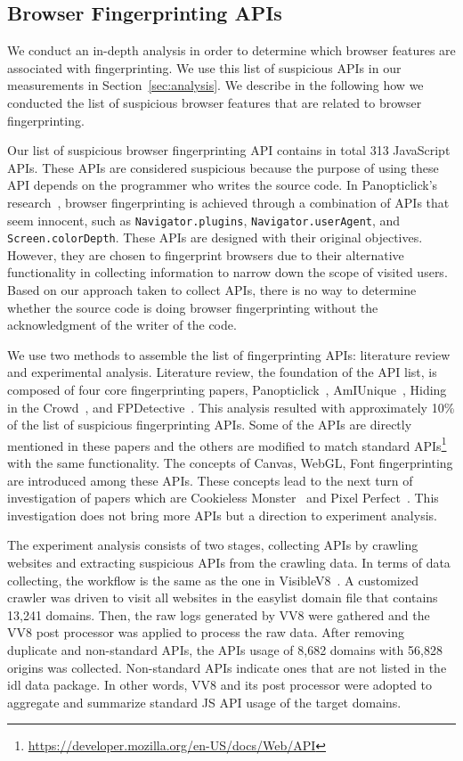 \subsection{Browser Fingerprinting APIs}
\label{sec:fp-apis}

We conduct an in-depth analysis in order to determine which browser features are associated with fingerprinting. We use this list of suspicious APIs in our measurements in Section~\ref{sec:analysis}. We describe in the following how we conducted the list of suspicious browser features that are related to browser fingerprinting.

Our list of suspicious browser fingerprinting API contains in total 313 JavaScript APIs. These APIs are considered suspicious because the purpose of using these API depends on the programmer who writes the source code. In Panopticlick's research~\cite{panopticlick}, browser fingerprinting is achieved through a combination of APIs that seem innocent, such as \texttt{Navigator.plugins}, \texttt{Navigator.userAgent}, and \texttt{Screen.colorDepth}. These APIs are designed with their original objectives. However, they are chosen to fingerprint browsers due to their alternative functionality in collecting information to narrow down the scope of visited users. Based on our approach taken to collect APIs, there is no way to determine whether the source code is doing browser fingerprinting without the acknowledgment of the writer of the code. 

We use two methods to assemble the list of fingerprinting APIs: literature review and experimental analysis. Literature review, the foundation of the API list, is composed of four core fingerprinting papers, Panopticlick~\cite{panopticlick}, AmIUnique~\cite{amiunique}, Hiding in the Crowd~\cite{hidinginthecrowd}, and FPDetective~\cite{fpdetective}. This analysis resulted with approximately 10\% of the list of suspicious fingerprinting APIs. Some of the APIs are directly mentioned in these papers and the others are modified to match standard APIs\footnote{\url{https://developer.mozilla.org/en-US/docs/Web/API}} with the same functionality. The concepts of Canvas, WebGL, Font fingerprinting are introduced among these APIs. These concepts lead to the next turn of investigation of papers which are Cookieless Monster~\cite{cookiemonster-SP13} and Pixel Perfect~\cite{mowery2012pixel}. This investigation does not bring more APIs but a direction to experiment analysis. 

The experiment analysis consists of two stages, collecting APIs by crawling websites and extracting suspicious APIs from the crawling data. In terms of data collecting, the workflow is the same as the one in VisibleV8~\cite{vv8-imc19}. A customized crawler was driven to visit all websites in the easylist domain file that contains 13,241 domains. Then, the raw logs generated by VV8 were gathered and the VV8 post processor was applied to process the raw data. After removing duplicate and non-standard APIs, the APIs usage of 8,682 domains with 56,828 origins was collected. Non-standard APIs indicate ones that are not listed in the idl data package. In other words, VV8 and its post processor were adopted to aggregate and summarize standard JS API usage of the target domains.

